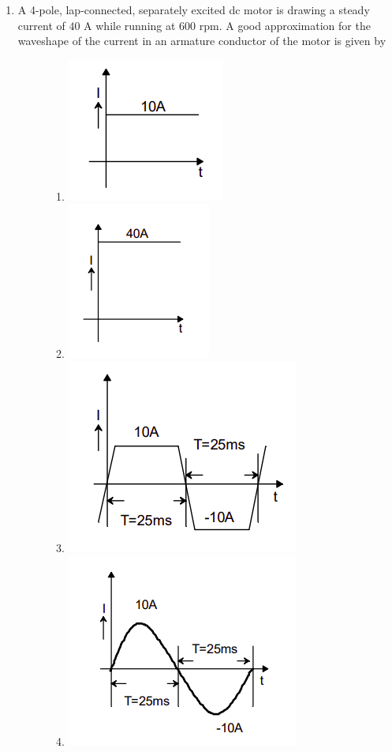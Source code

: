 \documentclass[journal,12pt,onecolumn]{IEEEtran}
\theoremstyle{remark}
\begin{document}
\begin{enumerate}[start=1, label=Q.\arabic*]
    \hfill{}

    \item A 4-pole, lap-connected, separately excited dc motor is drawing a steady current of $40$ A while running at $600$ rpm. A good approximation for the waveshape of the current in an armature conductor of the motor is given by
    \begin{figure}[H]
        \begin{enumerate}
            \item 
            \includegraphics[width=0.35\columnwidth]{Figures/q24A.png}
        \item 
            \includegraphics[width=0.35\columnwidth]{Figures/q24B.png}
        \item 
            \includegraphics[width=0.35\columnwidth]{Figures/q24C.png}
        \item         
            \includegraphics[width=0.35\columnwidth]{Figures/q24D.png}
        \caption{}
                \end{enumerate}


\end{figure}
\end{enumerate}
\end{document}
